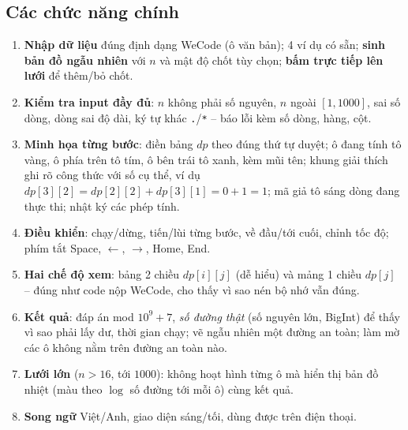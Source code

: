 \documentclass[12pt,a4paper]{article}
\begin{document}
\subsection{Các chức năng chính}
\begin{enumerate}
  \item \textbf{Nhập dữ liệu} đúng định dạng WeCode (ô văn bản); 4 ví dụ có sẵn; \textbf{sinh bản đồ ngẫu nhiên} với $n$ và mật độ chốt tùy chọn; \textbf{bấm trực tiếp lên lưới} để thêm/bỏ chốt.
  \item \textbf{Kiểm tra input đầy đủ}: $n$ không phải số nguyên, $n$ ngoài $[1,1000]$, sai số dòng, dòng sai độ dài, ký tự khác \texttt{.}/\texttt{*} -- báo lỗi kèm số dòng, hàng, cột.
  \item \textbf{Minh họa từng bước}: điền bảng $dp$ theo đúng thứ tự duyệt; ô đang tính tô vàng, ô phía trên tô tím, ô bên trái tô xanh, kèm mũi tên; khung giải thích ghi rõ công thức với số cụ thể, ví dụ $dp[3][2] = dp[2][2] + dp[3][1] = 0 + 1 = 1$; mã giả tô sáng dòng đang thực thi; nhật ký các phép tính.
  \item \textbf{Điều khiển}: chạy/dừng, tiến/lùi từng bước, về đầu/tới cuối, chỉnh tốc độ; phím tắt Space, $\leftarrow$, $\rightarrow$, Home, End.
  \item \textbf{Hai chế độ xem}: bảng 2 chiều $dp[i][j]$ (dễ hiểu) và mảng 1 chiều $dp[j]$ -- đúng như code nộp WeCode, cho thấy vì sao nén bộ nhớ vẫn đúng.
  \item \textbf{Kết quả}: đáp án mod $10^9+7$, \emph{số đường thật} (số nguyên lớn, BigInt) để thấy vì sao phải lấy dư, thời gian chạy; vẽ ngẫu nhiên một đường an toàn; làm mờ các ô không nằm trên đường an toàn nào.
  \item \textbf{Lưới lớn} ($n>16$, tới $1000$): không hoạt hình từng ô mà hiển thị bản đồ nhiệt (màu theo $\log$ số đường tới mỗi ô) cùng kết quả.
  \item \textbf{Song ngữ} Việt/Anh, giao diện sáng/tối, dùng được trên điện thoại.
\end{enumerate}
\end{document}
